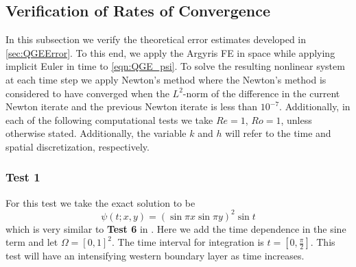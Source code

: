 \subsection{Verification of Rates of Convergence}
In this subsection we verify the theoretical error estimates developed in
\autoref{sec:QGEError}. To this end, we apply the Argyris FE in space while
applying implicit Euler in time to \eqref{eqn:QGE_psi}. To solve the resulting
nonlinear system at each time step we apply Newton's method where the Newton's
method is considered to have converged when the $L^2$-norm of the difference in
the current Newton iterate and the previous Newton iterate is less than
$10^{-7}$. Additionally, in each of the following computational tests we take
$Re = 1$, $Ro = 1$, unless otherwise stated. Additionally, the variable $k$ and
$h$ will refer to the time and spatial discretization, respectively.

\subsubsection*{Test 1}
For this test we take the exact solution to be
\begin{equation}
  \psi(t;x,y) = \left(\sin \pi x \sin \pi y\right)^2 \sin t
  \label{eqn:Test1}
\end{equation}
which is very similar to \textbf{Test 6} in \cite{Foster}. Here we add the time
dependence in the sine term and let $\Omega = [0,1]^2$. The time interval for
integration is $t = [0,\frac{\pi}{2}]$. This test will have an intensifying
western boundary layer as time increases.

